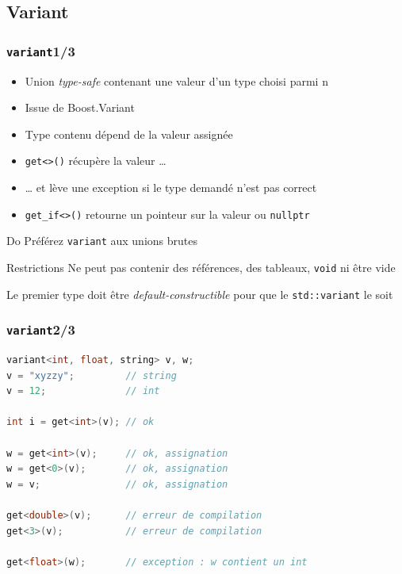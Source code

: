 \documentclass[C++.tex]{subfiles}
\begin{document}
\subsection*{Variant}
\begin{frame}[fragile]
	\frametitle{\lstinline|variant|\titlehfill{}1/3}
	\begin{itemize}
		\item Union \textit{type-safe} contenant une valeur d'un type choisi parmi n
		\item Issue de Boost.Variant
		\item Type contenu dépend de la valeur assignée
		\item \lstinline|get<>()| récupère la valeur \ldots
		\item \ldots{} et lève une exception si le type demandé n'est pas correct
		\item \lstinline|get_if<>()| retourne un pointeur sur la valeur ou \lstinline|nullptr|
	\end{itemize}

	\begin{exampleblock}{Do}
		Préférez \lstinline|variant| aux unions brutes
	\end{exampleblock}

	\begin{alertblock}{Restrictions}
		Ne peut pas contenir des références, des tableaux, \lstinline|void| ni être vide\\


		Le premier type doit être \textit{default-constructible} pour que le \lstinline|std::variant| le soit

	\end{alertblock}
\end{frame}

\begin{frame}[fragile]
	\frametitle{\lstinline|variant|\titlehfill{}2/3}
	\begin{lstlisting}[language=C++]
variant<int, float, string> v, w;
v = "xyzzy";         // string
v = 12;              // int

int i = get<int>(v); // ok

w = get<int>(v);     // ok, assignation
w = get<0>(v);       // ok, assignation
w = v;               // ok, assignation

get<double>(v);      // erreur de compilation
get<3>(v);           // erreur de compilation

get<float>(w);       // exception : w contient un int\end{lstlisting}
\end{frame}
\end{document}
